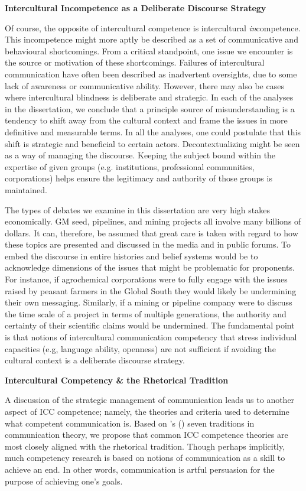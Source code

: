 \textbf{Intercultural Incompetence as a Deliberate Discourse Strategy}

Of course, the opposite of intercultural competence is intercultural \textit{in}competence. This incompetence might more aptly be described as a set of communicative and behavioural shortcomings. From a critical standpoint, one issue we encounter is the source or motivation of these shortcomings. Failures of intercultural communication have often been described as inadvertent oversights, due to some lack of awareness or communicative ability. However, there may also be cases where intercultural blindness is deliberate and strategic. In each of the analyses in the dissertation, we conclude that a principle source of misunderstanding is a tendency to shift away from the cultural context and frame the issues in more definitive and measurable terms. In all the analyses, one could postulate that this shift is strategic and beneficial to certain actors. Decontextualizing might be seen as a way of managing the discourse. Keeping the subject bound within the expertise of given groups (e.g. institutions, professional communities, corporations) helps ensure the legitimacy and authority of those groups is maintained.

The types of debates we examine in this dissertation are very high stakes economically. GM seed, pipelines, and mining projects all involve many billions of dollars. It can, therefore, be assumed that great care is taken with regard to how these topics are presented and discussed in the media and in public forums. To embed the discourse in entire histories and belief systems would be to acknowledge dimensions of the issues that might be problematic for proponents. For instance, if agrochemical corporations were to fully engage with the issues raised by peasant farmers in the Global South they would likely be undermining their own messaging. Similarly, if a mining or pipeline company were to discuss the time scale of a project in terms of multiple generations, the authority and certainty of their scientific claims would be undermined. The fundamental point is that notions of intercultural communication competency that stress individual capacities (e.g, language ability, openness) are not sufficient if avoiding the cultural context is a deliberate discourse strategy. 

\textbf{Intercultural Competency \& the Rhetorical Tradition}

A discussion of the strategic management of communication leads us to another aspect of ICC competence; namely, the theories and criteria used to determine what competent communication is. Based on \citeauthor{Craig1999a}'s (\citeyear{Craig1999a}) seven traditions in communication theory, we propose that common ICC competence theories are most closely aligned with the rhetorical tradition. Though perhaps implicitly, much competency research is based on notions of communication as a skill to achieve an end. In other words, communication is artful persuasion for the purpose of achieving one's goals. 

